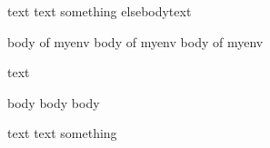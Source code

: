 text text
\if
 	something \else elsebody\fi text
\begin{myenv}
	body of myenv
	body of myenv
	body of myenv
\end{myenv}

text

\begin{anotherenv}
	body
	body
	body
\end{anotherenv}

text text
\if
 	something \fi